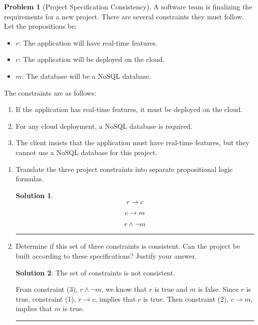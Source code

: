 \documentclass{article}
\theoremstyle{definition}
\newtheorem{problem}{Problem}
\def\fline{\rule{0.75\linewidth}{0.5pt}}
\newcommand{\finishline}{\begin{center}\fline\end{center}}
\newtheorem*{solution*}{Solution}
\newenvironment{solution}{\begin{solution*}}{{\finishline} \end{solution*}}
\begin{document}
    \begin{problem}[Project Specification Consistency]
    A software team is finalizing the requirements for a new project. There are several constraints they must follow. Let the propositions be:
    \begin{itemize}
        \item $r$: The application will have real-time features.
        \item $c$: The application will be deployed on the cloud.
        \item $m$: The database will be a NoSQL database.
    \end{itemize}
    The constraints are as follows:
    \begin{enumerate}
        \item If the application has real-time features, it must be deployed on the cloud.
        \item For any cloud deployment, a NoSQL database is required.
        \item The client insists that the application must have real-time features, but they cannot use a NoSQL database for this project.
    \end{enumerate}
    \begin{enumerate}[label=(\alph*)]
        \item Translate the three project constraints into separate propositional logic formulas.

        \begin{solution}
        
        \[
        r \rightarrow c
        \]

        \[
        c \rightarrow m
        \]

        \[
        r \land \neg m
        \]
    
        \end{solution}
        \item Determine if this set of three constraints is consistent. Can the project be built according to these specifications? Justify your answer.

        \begin{solution}
        
        The set of constraints is not consistent.

        From constraint (3), $r \land \neg m$, we know that $r$ is true
        and $m$ is false. Since $r$ is true, constraint (1),
        $r \rightarrow c$, implies that $c$ is true. Then constraint (2),
        $c \rightarrow m$, implies that $m$ is true.


\end{solution}
\end{enumerate}
\end{problem}
\end{document}

